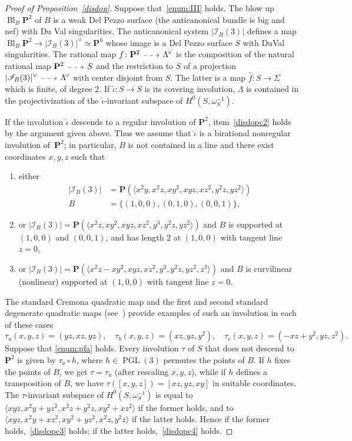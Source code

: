 \documentclass[11pt]{article}
\makeatletter
\let\mathcal\mathscr
\newenvironment{enumeratea}
{\bgroup\def\theenumi{\alph{enumi}}\def\theenumii{\arabic{enumii}}\begin{enumerate}}
{\end{enumerate}\egroup}
\newcommand{\dradpl}{{\!\!\xymatrix@C=8mm{\ar@{-->}[r]&}\!\!}}
\newcommand{\dratst}{{\,\mathrel{\scalebox{.8}{$\dradpl$}}\,}}
\newcommand{\drascst}{{\,\mathrel{\scalebox{.6}{$\dradpl$}}\,}}
\newcommand{\dra}{\mathchoice{\dradpl}{\dratst}{\drascst}{\drascst}}
\theoremstyle{definition}
\renewcommand\P{{\mathbf P}}\let\PP\P
\newcommand\cI{\mathcal{I}}
\let\wh\widehat
\let\la\langle
\let\ra\rangle
\let\cong\simeq
\DeclareMathOperator{\PGL}{PGL}
\DeclareMathOperator{\Bl}{Bl}
\renewcommand{\dratst}{\mathrel{\scalebox{.8}{$\dradpl$}}}
\renewcommand{\drascst}{\mathrel{\scalebox{.6}{$\dradpl$}}}
\makeatother
\begin{document}
\begin{proof}[Proof of Proposition~\ref{disdop}]
Suppose that~\eqref{enum:III} holds. The blow up $\Bl_{B}\PP^2$ of $B$ is a weak Del Pezzo surface (the anticanonical bundle is big and nef) with Du Val singularities. The anticanonical system
$|\cI_{B}(3)|$ defines a map $\Bl_{B}\PP^2\to |\cI_{B}(3)|^{\vee}\cong \P^6$ whose image is a Del Pezzo surface $ S$ with DuVal singularities. The rational map $f\colon\P^2\dra \Lambda^{\!\vee}$ is the composition of the natural rational map $\PP^2\dra { S}$ and the restriction to $ S$ of a projection $ |\cI_{B}(3)|^{\vee}\dra \Lambda^{\!\vee}$ with center disjoint from ${ S}$. The latter is
a map $\wh{f}\colon { S}\to \Sigma$ which is finite, of degree $2$. If $\wh{\iota}\colon { S}\to { S}$ is its covering involution, $\Lambda$ is contained in the projectivization of the $\wh{\iota}$-invariant subspace of $H^0({ S},\omega^{-1}_{{ S}})$.

If the involution $\wh{\iota}$ descends to a regular involution of $\PP^2$, item~\eqref{disdopc2} holds by the argument given above. Thus we assume that $\wh{\iota}$ is a birational nonregular involution of~$\PP^2$; in particular,
$B$ is not contained in a line and there exist coordinates $x,y,z$ such that
\begin{enumeratea}
\item\label{enum:pfa}
either\vspace*{-8pt}
\begin{align*}
|\cI_{B}(3)|&=\PP(\la x^2y, x^2z, xy^2,xyz, xz^2, y^2z, yz^2 \ra)\\\tag*{and} {B}&=\{(1,0,0),(0,1,0),(0,0,1)\},
\end{align*}
\item\label{enum:pfb}
or
$|\cI_{B}(3)|=\PP(\la x^2z, xy^2,xyz, xz^2, y^3, y^2z, yz^2 \ra)$ and $B$ is supported at $(1,0,0)$ and $(0,0,1)$, and has length $2$ at $(1,0,0)$ with tangent line $z=0$,
\item\label{enum:pfc}
or
$|\cI_{B}(3)|=\PP(\la x^2z-xy^2,xyz, xz^2, y^3, y^2z, yz^2,z^3 \ra)$ and $B$ is curvilinear (nonlinear) supported at $(1,0,0)$ with tangent line $z=0$.
\end{enumeratea}
The standard Cremona quadratic map and the first and second standard degenerate quadratic maps (see~\cite[Ex.\,7.1.9]{dolga}) provide examples of such an involution in each of these cases\vspace*{-3pt}\enlargethispage{1\baselineskip}%
\[
\tau_a(x,y,z)=(yz,xz,yz),\quad \tau_b(x,y,z)=(xz,yz,y^2),\quad \tau_c(x,y,z)=(-xz+y^2,yz,z^2).
\]
Suppose that \eqref{enum:pfa} holds. Every involution $\tau$ of ${ S}$ that does not descend to
$\PP^2$
is given by $\tau_a\circ h$, where $h\in\PGL(3)$ permutes the points of ${B}$. If $h$ fixes the points of $B$, we get $\tau=\tau_a$ (after rescaling $x,y,z$), while if $h$ defines a transposition of $B$, we have $\tau([x,y,z])=[xz,yz,xy]$ in suitable coordinates.
The $\tau$-invariant subspace of $H^0({ S},\omega^{-1}_{{ S}})$ is equal to $\la xyz,x^2y+yz^2,x^2z+y^2z,xy^2+xz^2\ra$ if the former holds, and to $\la xyz,x^2y+xz^2,xy^2+yz^2,x^2z,y^2z\ra$
if the latter holds.
Hence if the former holds,~\eqref{disdopc3} holds; if the latter holds,~\eqref{disdopc4} holds.


\end{proof}
\end{document}
